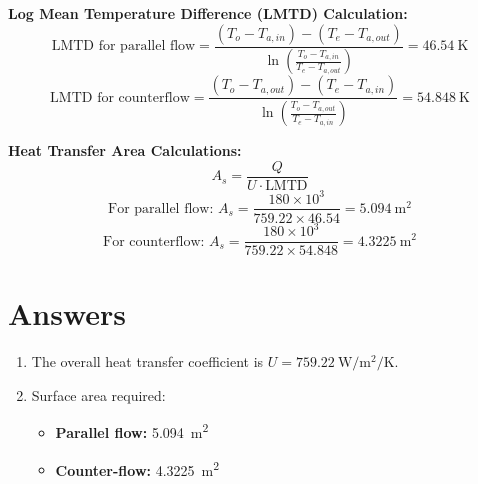 \documentclass{article}
\begin{document}
\textbf{Log Mean Temperature Difference (LMTD) Calculation:}
\[
\text{LMTD for parallel flow} = \frac{(T_o - T_{a,in}) - (T_e - T_{a,out})}{\ln \left( \frac{T_o - T_{a,in}}{T_e - T_{a,out}} \right)} = \SI{46.54}{\kelvin}
\]
\[
\text{LMTD for counterflow} = \frac{(T_o - T_{a,out}) - (T_e - T_{a,in})}{\ln \left( \frac{T_o - T_{a,out}}{T_e - T_{a,in}} \right)} = \SI{54.848}{\kelvin}
\]

\textbf{Heat Transfer Area Calculations:}
\[
A_s = \frac{Q}{U \cdot \text{LMTD}}
\]
\[
\text{For parallel flow: } A_s = \frac{180 \times 10^3}{759.22 \times 46.54} = \SI{5.094}{\meter\squared}
\]
\[
\text{For counterflow: } A_s = \frac{180 \times 10^3}{759.22 \times 54.848} = \SI{4.3225}{\meter\squared}
\]

\section*{Answers}
\begin{enumerate}
    \item[(a)] The overall heat transfer coefficient is $U = \SI{759.22}{\watt\per\meter\squared\per\kelvin}$.
    \item[(b)] Surface area required:
    \begin{itemize}
        \item \textbf{Parallel flow:} \SI{5.094}{\meter\squared}
        \item \textbf{Counter-flow:} \SI{4.3225}{\meter\squared}
    \end{itemize}
\end{enumerate}
\end{document}
